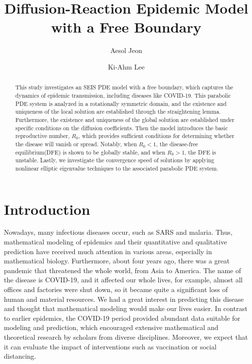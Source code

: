 \documentclass[11pt]{amsart}
\title[Diffusion-Reaction Epidemic Model with a Free Boundary]{Diffusion-Reaction Epidemic Model with a Free Boundary}
\author{Aesol Jeon}
\author{Ki-Ahm Lee}
\numberwithin{equation}{section}
\theoremstyle{plain}
\theoremstyle{definition}
\begin{document}
\begin{abstract}
	This study investigates an SEIS PDE model with a free boundary, which captures the dynamics of epidemic transmission, including diseases like COVID-19. This parabolic PDE system is analyzed in a rotationally symmetric domain, and the existence and uniqueness of the local solution are established through the straightening lemma. Furthermore, the existence and uniqueness of the global solution are established under specific conditions on the diffusion coefficients. Then the model introduces the basic reproductive number, $R_0$, which provides sufficient conditions for determining whether the disease will vanish or spread. Notably, when $R_0<1$, the disease-free equilibrium(DFE) is shown to be globally stable, and when $R_0>1$, the DFE is unstable. Lastly, we investigate the convergence speed of solutions by applying nonlinear elliptic eigenvalue techniques to the associated parabolic PDE system.
\end{abstract}

\maketitle

% 
% 
\section{Introduction}
Nowadays, many infectious diseases occur, such as SARS and malaria. Thus, mathematical modeling of epidemics and their quantitative and qualitative prediction have received much attention in various areas, especially in mathematical biology. 
Furthermore, about four years ago, there was a great pandemic that threatened the whole world, from Asia to America. The name of the disease is COVID-19, and it affected our whole lives, for example, almost all offices and factories were shut down, so it became quite a significant loss of human and material resources. We had a great interest in predicting this disease and thought that mathematical modeling would make our lives easier. In contrast to earlier epidemics, the COVID-19 period provided abundant data suitable for modeling and prediction, which encouraged extensive mathematical and theoretical research by scholars from diverse disciplines. Moreover, we expect that it can evaluate the impact of interventions such as vaccination or social distancing.
\end{document}
